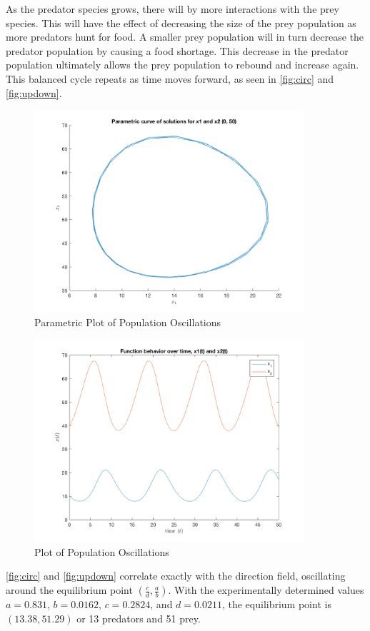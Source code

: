 \documentclass[12pt]{article}   %
\theoremstyle{definition}
\numberwithin{equation}{section}
\begin{document}
\quad As the predator species grows, there will by more interactions with the prey species. This will have the effect of decreasing the size of the prey population as more predators hunt for food. A smaller prey population will in turn decrease the predator population by causing a food shortage. This decrease in the predator population ultimately allows the prey population to rebound and increase again. This balanced cycle repeats as time moves forward, as seen in \autoref{fig:circ} and \autoref{fig:updown}. 

\begin{figure} [h] 
  \centering
  \includegraphics[width=10cm]{images/circ.png}
  \caption{Parametric Plot of Population Oscillations}
  \label{fig:circ}
\end{figure}


\begin{figure} [h] 
  \centering
  \includegraphics[width=10cm]{images/updown.png}
  \caption{Plot of Population Oscillations}
  \label{fig:updown}
\end{figure}

\quad  \autoref{fig:circ} and \autoref{fig:updown} correlate exactly with the direction field, oscillating around the equilibrium point $(\frac{c}{d},\frac{a}{b})$. With the experimentally determined values $a=0.831$, $b=0.0162$, $c=0.2824$, and $d=0.0211$, the equilibrium point is $(13.38,51.29)$ or 13 predators and 51 prey. 
\end{document}
